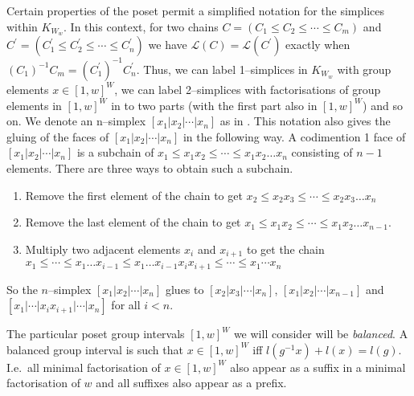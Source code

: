 \documentclass[class=article, crop=false]{standalone}
\begin{document}
Certain properties of the poset permit a simplified notation for the simplices within $K_{W_w}$. In this context, for two chains $C=(C_1 \leq C_2 \leq \cdots \leq C_m)$ and $C^\prime = (C_1^\prime \leq C_2^\prime \leq \cdots \leq C_n^\prime)$ we have $\mathcal{L}(C) = \mathcal{L}(C^\prime)$ exactly when $(C_1)^{-1}C_m = (C_1^\prime)^{-1}C_n^\prime$. Thus, we can label 1--simplices in $K_{W_w}$ with group elements $x \in [1,w]^W$, we can label 2--simplices with factorisations of group elements in $[1,w]^W$ in to two parts (with the first part also in $[1,w]^W$) and so on. We denote an n--simplex $[x_1 | x_2 | \cdots | x_n]$ as in \cite[Definition 2.8]{paolini_salvetti_kpi1_2021}. This notation also gives the gluing of the faces of $[x_1 | x_2 | \cdots | x_n]$ in the following way. A codimention 1 face of $[x_1 | x_2 | \cdots | x_n]$ is a subchain of $x_1 \leq x_1x_2 \leq \cdots \leq x_1x_2\ldots x_n$ consisting of $n-1$ elements. There are three ways to obtain such a subchain.
\begin{enumerate}
    \item \label{item:gluing_step_1} Remove the first element of the chain to get $x_2 \leq x_2x_3 \leq \cdots \leq x_2x_3\ldots x_n$
    \item \label{item:gluing_step_2} Remove the last element of the chain to get $x_1 \leq x_1x_2 \leq \cdots \leq x_1x_2\ldots x_{n-1}$.
    \item \label{item:gluing_step_3} Multiply two adjacent elements $x_i$ and $x_{i+1}$ to get the chain $x_1 \leq \cdots \leq x_1 \ldots x_{i-1} \leq x_1 \ldots x_{i-1}x_ix_{i+1} \leq \cdots \leq x_1\cdots x_n$ 
\end{enumerate}

So the $n$--simplex $[x_1 | x_2 | \cdots | x_n]$ glues to $[x_2|x_3|\cdots|x_n]$, $[x_1|x_2|\cdots|x_{n-1}]$ and $[x_1| \cdots | x_ix_{i+1} | \cdots |x_n]$ for all $i<n$.

The particular poset group intervals $[1,w]^W$ we will consider will be \emph{balanced}. A balanced group interval is such that  $x \in [1,w]^W$ iff $l(g^{-1}x) + l(x) = l(g)$. I.e.~all minimal factorisation of $x \in [1,w]^W$ also appear as a suffix in a minimal factorisation of $w$ and all suffixes also appear as a prefix.
\end{document}
